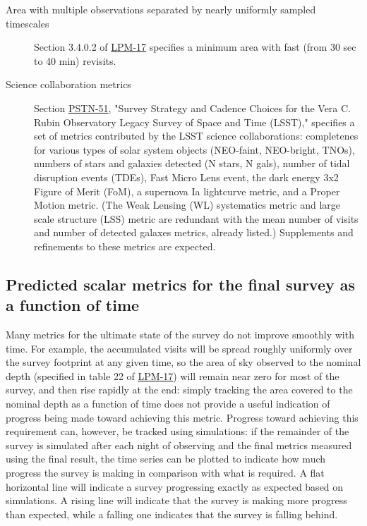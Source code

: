 \begin{description}
\item[{Area with multiple observations separated by nearly uniformly sampled timescales}] Section 3.4.0.2 of \href{http://ls.st/lpm-17}{LPM-17} specifies a minimum area with fast (from 30 sec to 40 min) revisits.
\item[{Science collaboration metrics}] Section \href{https://ls.st/pstn-051}{PSTN-51}, "Survey Strategy and Cadence Choices for the Vera C. Rubin Observatory Legacy Survey of Space and Time (LSST)," specifies a set of metrics contributed by the LSST science collaborations: completenes for various types of solar system objects (NEO-faint, NEO-bright, TNOs), numbers of stars and galaxies detected (N stars, N gals), number of tidal disruption events (TDEs), Fast Micro Lens event, the dark energy 3x2 Figure of Merit (FoM), a supernova Ia lightcurve metric, and a Proper Motion metric. (The Weak Lensing (WL) systematics metric and large scale structure (LSS) metric are redundant with the mean number of visits and number of detected galaxes metrics, already listed.) Supplements and refinements to these metrics are expected.
\end{description}

\subsection{Predicted scalar metrics for the final survey as a function of time}
\label{sec:org2f8c9d1}
Many metrics for the ultimate state of the survey do not improve smoothly with time.
For example, the accumulated visits will be spread roughly uniformly over the survey footprint at any given time, so the area of sky observed to the nominal depth (specified in table 22 of \href{http://ls.st/lpm-17}{LPM-17}) will remain near zero for most of the survey, and then rise rapidly at the end: simply tracking the area covered to the nominal depth as a function of time does not provide a useful indication of progress being made toward achieving this metric.
Progress toward achieving this requirement can, however, be tracked using simulations: if the remainder of the survey is simulated after each night of observing and the final metrics measured using the final result, the time series can be plotted to indicate how much progress the survey is making in comparison with what is required.
A flat horizontal line will indicate a survey progressing exactly as expected based on simulations.
A rising line will indicate that the survey is making more progress than expected, while a falling one indicates that the survey is falling behind.

